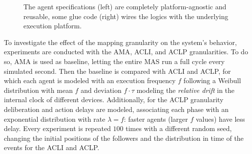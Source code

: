 \begin{figure}
    \begin{minipage}[b]{.6\linewidth}
        \centering
        
    \end{minipage}
    \hfill
    \begin{minipage}[b]{.34\linewidth}
        \centering
        
    \end{minipage}
    \caption{
        The agent specifications (left) are completely platform-agnostic and reusable,
        some glue code (right) wires the logics with the underlying execution platform.
    }
    \label{fig:code}
\end{figure}


To investigate the effect of the mapping granularity on the system's behavior, experiments are conducted with the \ac{AMA}, \ac{ACLI}, and \ac{ACLP} granularities.
%
To do so, \ac{AMA} is used as baseline,
letting the entire \ac{MAS} run a full cycle every simulated second.
%
Then the baseline is compared with \ac{ACLI} and \ac{ACLP},
for which each agent is modeled with an execution frequency $f$
following a Weibull distribution with mean $f$ and deviation $f\cdot\tau$ modeling the \emph{relative drift} in the internal clock of different devices.
%
Additionally, for the \ac{ACLP} granularity deliberation and action delays are modeled,
associating each phase with an exponential distribution with rate $\lambda = f$:
faster agents (larger $f$ values) have less delay.
%
Every experiment is repeated $100$ times with a different random seed, changing
the initial positions of the followers
and the distribution in time of the events for the \ac{ACLI} and \ac{ACLP}.

